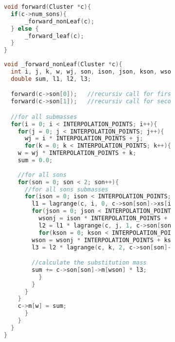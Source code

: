 \begin{figure}[t]
  \begin{subfigure}{0.9\textwidth}
    \begin{lstlisting}[language=C, label=lst:forw, caption={Diese Methode dient dem rekursiven Aufruf der Vorwärtstransformation und delegiert die Konstruktion der Ersatzmassen.
							    Dabei wird zwischen Blatt-und Nicht-Blattclustern unterschieden.}]
void forward(Cluster *c){
  if(c->num_sons){
      _forward_nonLeaf(c);
  } else {
      _forward_leaf(c);
  }
}
    \end{lstlisting}
  \end{subfigure}
\end{figure}

\begin{figure}[p]
  \begin{subfigure}{0.9\textwidth}
    \begin{lstlisting}[language=C, label=lst:forwnonleaf, caption={Diese Methode arbeitet auf den Transfermatrizen und ruft daher zuerst rekursiv die Vorwärtstransformation für die Sohncluster auf.}]
void _forward_nonLeaf(Cluster *c){
  int i, j, k, w, wj, son, ison, json, kson, wson, wsonj;
  double sum, l1, l2, l3;

  forward(c->son[0]);	//recursiv call for first son
  forward(c->son[1]);	//recursiv call for second son

  //for all submasses
  for(i = 0; i < INTERPOLATION_POINTS; i++){
    for(j = 0; j < INTERPOLATION_POINTS; j++){
      wj = i * INTERPOLATION_POINTS + j;
      for(k = 0; k < INTERPOLATION_POINTS; k++){
	w = wj * INTERPOLATION_POINTS + k;
	sum = 0.0;
	
	//for all sons
	for(son = 0; son < 2; son++){
	  //for all sons submasses
	  for(ison = 0; ison < INTERPOLATION_POINTS; ison++){
	    l1 = lagrange(c, i, 0, c->son[son]->xs[ison]);
	    for(json = 0; json < INTERPOLATION_POINTS; json++){
	      wsonj = ison * INTERPOLATION_POINTS + json;
	      l2 = l1 * lagrange(c, j, 1, c->son[son]->xs[INTERPOLATION_POINTS + json]);
	      for(kson = 0; kson < INTERPOLATION_POINTS; kson++){
		wson = wsonj * INTERPOLATION_POINTS + kson;
		l3 = l2 * lagrange(c, k, 2, c->son[son]->xs[2 * INTERPOLATION_POINTS + kson]);

		//calculate the substitution mass
		sum += c->son[son]->m[wson] * l3;
	      }
	    }
	  }
	}
	c->m[w] = sum;
      }
    }
  }
}     
    \end{lstlisting}
  \end{subfigure}
\end{figure}

